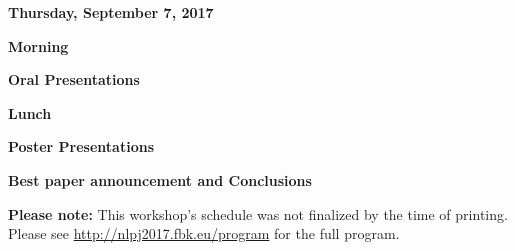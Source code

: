 
\item[] {\Large\bfseries Thursday, September 7, 2017}\\\vspace{1.5ex}

\vspace{1ex}
\item[] {\bfseries Morning}

\vspace{1ex}
\item[] {\bfseries Oral Presentations}
\item[$\bullet$] 
\item[$\bullet$] 
\item[$\bullet$] 
\item[$\bullet$] 
\item[$\bullet$] 
\item[$\bullet$] 
\item[$\bullet$] 
\item[$\bullet$] 
\item[$\bullet$] 

\vspace{1ex}
\item[] {\bfseries Lunch}

\vspace{1ex}
\item[] {\bfseries Poster Presentations}
\item[$\bullet$] 
\item[$\bullet$] 
\item[$\bullet$] 
\item[$\bullet$] 
\item[$\bullet$] 
\item[$\bullet$] 
\item[$\bullet$] 
\item[$\bullet$] 
\item[$\bullet$] 
\item[$\bullet$] 

\vspace{1ex}
\item[] {\bfseries Best paper announcement and Conclusions}

\vfill
\textbf{Please note:} This workshop's schedule was not finalized by the time of printing. Please see \url{http://nlpj2017.fbk.eu/program} for the full program.
